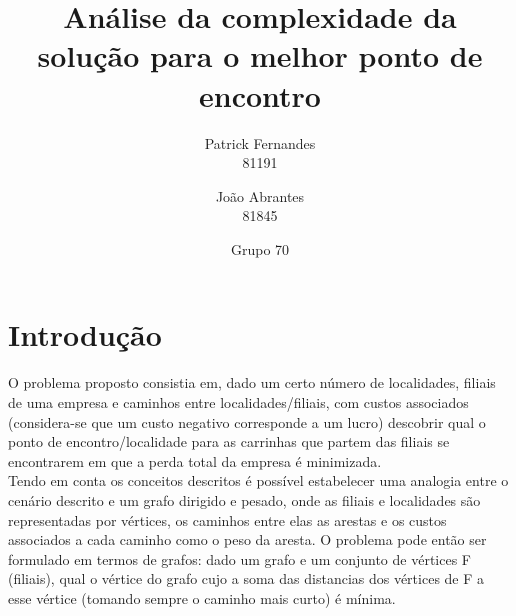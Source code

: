 \documentclass[12pt]{article}
\title{Análise da complexidade da solução para o melhor ponto de encontro}
\author{Patrick Fernandes\\81191 \and João Abrantes\\81845}
\date{Grupo 70}
\begin{document}
\maketitle
\section{Introdução}
O problema proposto consistia em, dado um certo número de localidades, filiais de uma empresa e caminhos entre localidades/filiais, com custos associados (considera-se que um custo negativo corresponde a um lucro) descobrir qual o ponto de encontro/localidade para as carrinhas que partem das filiais se encontrarem em que a perda total da empresa é minimizada.\\
\indent Tendo em conta os conceitos descritos é possível estabelecer uma analogia entre o cenário descrito e um grafo dirigido e pesado, onde as filiais e localidades são representadas por vértices, os caminhos entre elas as arestas e os custos associados a cada caminho como o peso da aresta. O problema pode então ser formulado em termos de grafos: dado um grafo e um conjunto de vértices F (filiais), qual o vértice do grafo cujo a soma das distancias dos vértices de F a esse vértice (tomando sempre o caminho mais curto) é mínima.
\end{document}
